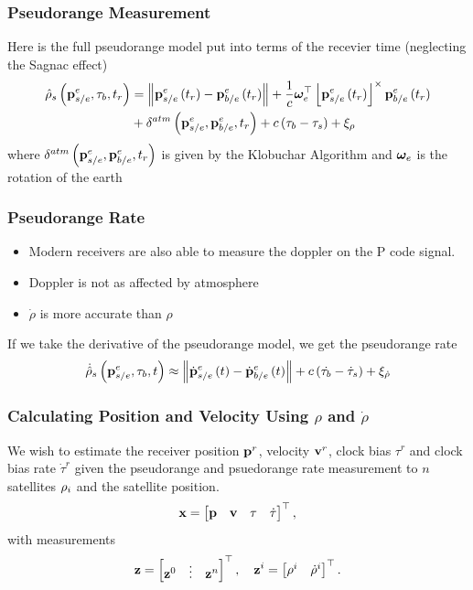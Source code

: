 \documentclass{beamer}
\newcommand{\norm}[1]{\left\lVert#1\right\rVert}
\begin{document}
\begin{frame}\frametitle{Pseudorange Measurement}
Here is the full pseudorange model put into terms of the recevier time (neglecting the Sagnac effect)
\begin{align*}
\hat{\rho}_{s}\left(\p_{s/e}^{e},\tau_{b},t_r\right) &= \norm{\p_{s/e}^{e}\left(t_r\right)-\p_{b/e}^{e}\left(t_r\right)}+\frac{1}{c}\w_{e}^{\top}
\skew{\p_{s/e}^{e}\left(t_r\right)}\p_{b/e}^{e}\left(t_r\right)\\
&+\delta^{atm}\left(\p_{s/e}^{e},\p_{b/e}^{e},t_r\right)+c\left(\tau_{b}-\tau_{s}\right)+\xi_{\rho}
\end{align*}
where $\delta^{atm}\left(\mathbf{p}_{s/e}^{e},\mathbf{p}_{b/e}^{e},t_r\right)$ is given
by the Klobuchar Algorithm and $\boldsymbol{\omega}_{e}$ is the rotation of the earth
\end{frame}


\begin{frame}\frametitle{Pseudorange Rate}
\begin{itemize}
	\item Modern receivers are also able to measure the doppler on the P code signal.
	\item Doppler is not as affected by atmosphere
	\item $\dot{\rho}$ is more accurate than $\rho$
\end{itemize}
If we take the derivative of the pseudorange model, we get the pseudorange rate
\begin{equation}
	\dot{\hat{\rho}}_{s}\left(\p_{s/e}^{e},\tau_{b},t\right)\approx\norm{\dot{\p}_{s/e}^{e}\left(t\right)-\dot{\p}_{b/e}^{e}\left(t\right)}+c\left(\dot{\tau_{b}}-\dot{\tau}_{s}\right)+\xi_{\dot{\rho}}
\end{equation}
\end{frame}

\begin{frame}\frametitle{Calculating Position and Velocity Using $\rho$ and $\dot{\rho}$}
We wish to estimate the receiver position $\mathbf{p}^{r}$,
velocity $\mathbf{v}^{r}$, clock bias $\tau^{r}$ and clock bias rate $\dot{\tau}^{r}$
given the pseudorange and psuedorange rate measurement to $n$ satellites
$\rho_{i}$ and the satellite position.
\begin{equation}
	\mathbf{x}=\begin{bmatrix}\mathbf{p}& \mathbf{v}& \tau& \dot{\tau} \end{bmatrix}^\top,
\end{equation}
with measurements
\begin{equation}
	\mathbf{z}=\begin{bmatrix}\mathbf{z}^{0}& \vdots& \mathbf{z}^{n} \end{bmatrix}^\top, 
	\quad\mathbf{z}^{i}=\begin{bmatrix}\rho^{i}& \dot{\rho}^{i} \end{bmatrix}^\top.
\end{equation}
\end{frame}
\end{document}
